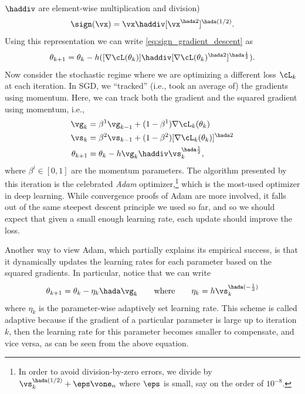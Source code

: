 \documentclass[../../book-main.tex]{subfiles}
\begin{document}
\(\haddiv\) are element-wise multiplication and division)
\begin{equation}
    \sign(\vx) = \vx \haddiv [\vx^{\hada 2}]^{\hada (1/2)}.
\end{equation}
Using this representation we can write \eqref{eq:sign_gradient_descent} as
\begin{equation}
    \theta_{k + 1} = \theta_{k} - h ([\nabla \cL(\theta_{k})] \haddiv [\nabla
    \cL(\theta_{k})^{\hada 2}]^{\hada \frac{1}{2}}).
\end{equation}
Now consider the stochastic regime where we are optimizing a
different loss \(\cL_{k}\) at each iteration. In SGD, we ``tracked''
(i.e., took an average of) the gradients using momentum. Here, we can
track both the gradient and the squared gradient using momentum, i.e.,
\begin{align}
    \vg_{k}
    &= \beta^{1}\vg_{k - 1} + (1 - \beta^{1})\nabla \cL_{k}(\theta_{k}) \\
    \vs_{k}
    &= \beta^{2}\vs_{k - 1} + (1 - \beta^{2})[\nabla
    \cL_{k}(\theta_{k})]^{\hada 2}  \\
    \theta_{k + 1}
    &= \theta_{k} - h\vg_{k}\haddiv\vs_{k}^{\hada \frac{1}{2}},
\end{align}
where \(\beta^{i} \in [0, 1]\) are the momentum parameters. The algorithm
presented by this iteration is the celebrated \textit{Adam}
optimizer,\footnote{In order to avoid division-by-zero errors, we divide by
    \(\vs_{k}^{\hada (1/2)} + \eps \vone_{n}\) where \(\eps\) is small,
say on the order of \(10^{-8}\).} which is the most-used optimizer in
deep learning. While convergence proofs of Adam are more involved, it
falls out of the same steepest descent principle we used so far, and
so we should expect that given a small enough learning rate, each
update should improve the loss.

Another way to view Adam, which partially explains its empirical
success, is that it dynamically updates the learning rates for each
parameter based on the squared gradients. In particular, notice that
we can write
\begin{equation}
    \theta_{k + 1} = \theta_{k} - \eta_{k} \hada \vg_{k} \qquad \text{where}
    \qquad \eta_{k} = h \vs_{k}^{\hada (-\frac{1}{2})}
\end{equation}
where \(\eta_{k}\) is the parameter-wise adaptively set learning
rate. This scheme is called adaptive because if the gradient of a
particular parameter is large up to iteration \(k\), then the
learning rate for this parameter becomes smaller to compensate, and
vice versa, as can be seen from the above equation.
\end{document}
